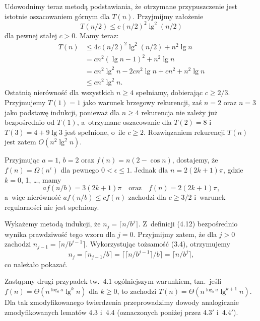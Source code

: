 Udowodnimy teraz metodą podstawiania, że otrzymane przypuszczenie jest istotnie oszacowaniem górnym dla $T(n)$.
Przyjmijmy założenie
\[
	T(n/2) \le c(n/2)^2\lg^2(n/2)
\]
dla pewnej stałej $c>0$.
Mamy teraz:
\begin{align*}
	T(n) &\le 4c(n/2)^2\lg^2(n/2)+n^2\lg n \\
	&= cn^2(\lg n-1)^2+n^2\lg n \\
	&= cn^2\lg^2n-2cn^2\lg n+cn^2+n^2\lg n \\
	&\le cn^2\lg^2n.
\end{align*}
Ostatnią nierówność dla wszystkich $n\ge4$ spełniamy, dobierając $c\ge2/3$.
Przyjmujemy $T(1)=1$ jako warunek brzegowy rekurencji, zaś $n=2$ oraz $n=3$ jako podstawę indukcji, ponieważ dla $n\ge4$ rekurencja nie zależy już bezpośrednio od $T(1)$, a~otrzymane oszacowanie dla $T(2)=8$ i~$T(3)=4+9\lg3$ jest spełnione, o~ile $c\ge2$.
Rozwiązaniem rekurencji $T(n)$ jest zatem $O(n^2\lg^2n)$.

\exercise %
Przyjmując $a=1$, $b=2$ oraz $f(n)=n(2-\cos n)$, dostajemy, że $f(n)=\Omega(n^\epsilon)$ dla pewnego $0<\epsilon\le1$.
Jednak dla $n=2(2k+1)\pi$, gdzie $k=0$, 1, \dots, mamy
\[
	af(n/b) = 3(2k+1)\pi \quad\text{oraz}\quad f(n) = 2(2k+1)\pi,
\]
a~więc nierówność $af(n/b)\le cf(n)$ zachodzi dla $c\ge3/2$ i~warunek regularności nie jest spełniony.


\exercise %
Wykażemy metodą indukcji, że $n_j=\bigl\lceil n/b^j\bigr\rceil$.
Z~definicji (4.12) bezpośrednio wynika prawdziwość tego wzoru dla $j=0$.
Przyjmijmy zatem, że dla $j>0$ zachodzi $n_{j-1}=\bigl\lceil n/b^{j-1}\bigr\rceil$.
Wykorzystując tożsamość (3.4), otrzymujemy
\[
	n_j = \lceil n_{j-1}/b\rceil = \bigl\lceil\bigl\lceil n/b^{j-1}\bigr\rceil/b\bigr\rceil = \bigl\lceil n/b^j\bigr\rceil,
\]
co należało pokazać.

\exercise %
Zastąpmy drugi przypadek tw.\ 4.1 ogólniejszym warunkiem, tzn.\ jeśli $f(n)=\Theta(n^{\log_ba}\lg^kn)$ dla $k\ge0$, to zachodzi $T(n)=\Theta(n^{\log_ba}\lg^{k+1}n)$.
Dla tak zmodyfikowanego twierdzenia przeprowadzimy dowody analogicznie zmodyfikowanych lematów 4.3 i~4.4 (oznaczonych poniżej przez 4.3$'$ i~4.4$'$).

